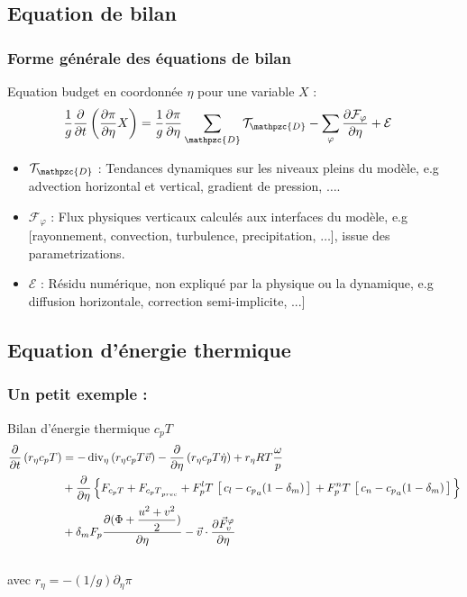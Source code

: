 \documentclass[aspectratio=169]{beamer}
\newcommand{\dr}{\partial}
\begin{document}
\subsection{Equation de bilan}
\begin{frame}
\frametitle{\normalsize Forme générale des équations de bilan}
\vspace{-0.25cm}
\begin{block}{\small Equation budget en coordonnée $\eta$ pour une variable $X$ :}
%  
\small
\begin{align*}
\frac{1}{g}\frac{\dr}{\dr t}\lp \frac{\dr \pi}{\dr\eta}X \rp & = 
\frac{1}{g}\frac{\dr \pi}{\dr\eta}\sum_{\mathpzc{D}} \mathcal{T}_{\mathpzc{D}} 
- \sum_{\varphi} \frac{\dr \mathcal{F}_{\varphi}}{\dr\eta}
+ \mathcal{E}
\end{align*}
%
\begin{itemize}
\item $\mathcal{T}_{\mathpzc{D}}$ : Tendances dynamiques sur les niveaux pleins du modèle, 
e.g advection horizontal et vertical, gradient de pression,  $\ldots$.
%
\item $\mathcal{F}_{\varphi}$ : Flux physiques verticaux calculés aux interfaces du modèle, 
e.g [rayonnement, convection, turbulence, precipitation, $\ldots$], issue des parametrizations.
%
\item $\mathcal{E}$ : Résidu numérique, non expliqué par la physique ou la dynamique, e.g diffusion horizontale, correction semi-implicite, ...]  
\end{itemize}
%
\end{block}
\end{frame}

\subsection{Equation d'énergie thermique}
\begin{frame}
\frametitle{{\normalsize Un petit exemple :} }

\begin{block}{Bilan d'énergie thermique $c_p T$}
\footnotesize
\begin{align}
  \frac{\displaystyle \partial }{\displaystyle \partial t}\left(r_{\eta} c_p T\right) &=
  - \mathop{\rm div}\nolimits_{\eta}\left(r_{\eta} c_p T \vec{v}\right)
  - \frac{\displaystyle \partial }{\displaystyle \partial \eta}\left(r_{\eta} c_p T \dot{\eta}\right)
  + r_{\eta} R T \frac{\omega}{p}\nonumber \\
  &  +\frac{\displaystyle \partial }{\displaystyle \partial \eta}\left\{ F_{c_p T} + F_{{c_p T}_{prec}}{}
  + F_{p}^{l} T \, \left[ \, c_l - {c_{p}}_{a} (1-\delta_m)\, \right] \, 
  + F_{p}^{n} T \, \left[ \, c_n - {c_{p}}_{a} (1-\delta_m)\, \right] \,\right\}\nonumber\\
  & 
  +\delta_mF_{p}\frac{\displaystyle \partial (\Phi+\frac{u^2+v^2}{2})}{\displaystyle \partial \eta}
  -\vec v\cdot\frac{\displaystyle \partial \vec F_v^{\varphi}}{\displaystyle \partial \eta}\label{Bilh}
\end{align}
\vspace*{0.5cm}\\
avec $r_{\eta}=-(1/g)\dr_{\eta}\pi$
\end{block}


\logos

\end{frame}
\end{document}

